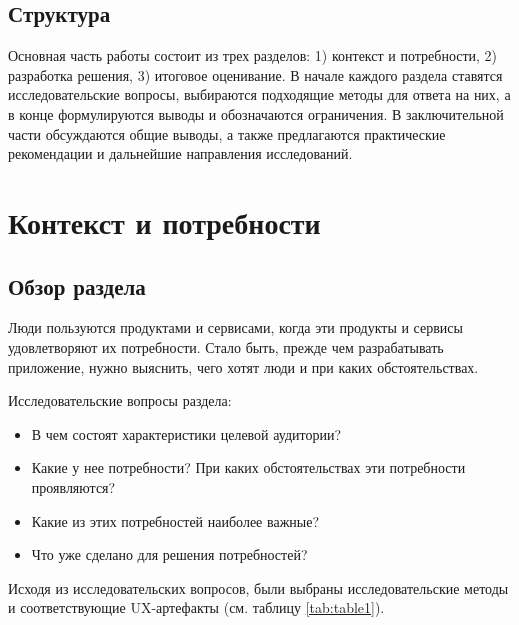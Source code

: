 \documentclass[pdflatex,sn-mathphys-num]{sn-jnl}%
\theoremstyle{thmstyleone}%
\theoremstyle{thmstyletwo}%
\theoremstyle{thmstylethree}%
\begin{document}
\subsection{Структура}\label{Structure}

Основная часть работы состоит из трех разделов: 1) контекст и потребности, 2) разработка решения, 3) итоговое оценивание. В начале каждого раздела ставятся исследовательские вопросы, выбираются подходящие методы для ответа на них, а в конце формулируются выводы и обозначаются ограничения. В заключительной части обсуждаются общие выводы, а также предлагаются практические рекомендации и дальнейшие направления исследований.

\newpage

\section{Контекст и потребности}\label{Context and Needs}

\subsection{Обзор раздела}\label{Overview1}

Люди пользуются продуктами и сервисами, когда эти продукты и сервисы удовлетворяют их потребности. Стало быть, прежде чем разрабатывать приложение, нужно выяснить, чего хотят люди и при каких обстоятельствах.

\bigskip
Исследовательские вопросы раздела:

\begin{itemize}
    \item В чем состоят характеристики целевой аудитории?
    \item Какие у нее потребности? При каких обстоятельствах эти потребности проявляются?
    \item Какие из этих потребностей наиболее важные?
    \item Что уже сделано для решения потребностей?
\end{itemize}

Исходя из исследовательских вопросов, были выбраны исследовательские методы и соответствующие UX-артефакты (см. таблицу \ref{tab:table1}).
\end{document}
